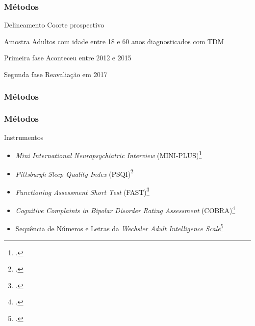 \documentclass{beamer}
\begin{document}
\begin{frame}
\frametitle{Métodos}


    \begin{block}{Delineamento}
        Coorte prospectivo
    \end{block}

    \begin{block}{Amostra}
        Adultos com idade entre 18 e 60 anos diagnosticados com TDM
    \end{block}

    \begin{block}{Primeira fase}
        Aconteceu entre 2012 e 2015
    \end{block}

    \begin{block}{Segunda fase}
        Reavaliação em 2017
    \end{block}

\end{frame}

\begin{frame}
\frametitle{Métodos}


    \centering

\end{frame}

\begin{frame}
\frametitle{Métodos}


    \begin{block}{Instrumentos}
        \begin{itemize}
            \item \emph{Mini International Neuropsychiatric Interview} (MINI-PLUS)\footcite{amorim_mini_2000}
            \item \emph{Pittsburgh Sleep Quality Index} (PSQI)\footcite{bertolazi_validation_2011}
            \item \emph{Functioning Assessment Short Test} (FAST)\footcite{cacilhas_validity_2009}
            \item \emph{Cognitive Complaints in Bipolar Disorder Rating Assessment} (COBRA)\footcite{lima_validity_2018}
            \item Sequência de Números e Letras da \emph{Wechsler Adult Intelligence Scale}\footcite{wechsler_wais_2004}
        \end{itemize}
    \end{block}

\end{frame}
\end{document}
